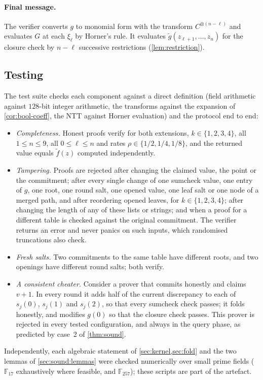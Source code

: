 \paragraph{Final message.}
The verifier converts $g$ to monomial form with the transform $C^{\otimes (n-\ell)}$ and evaluates $G$ at each $\xi_\ell$ by Horner's rule.
It evaluates $\tilde g(z_{\ell+1},\dots,z_{n})$ for the closure check by $n-\ell$ successive restrictions (\cref{lem:restriction}).

\subsection{Testing}\label{sec:impl:tests}

The test suite checks each component against a direct definition (field arithmetic against $128$-bit integer arithmetic, the transforms against the expansion of \cref{cor:bool-coeff}, the NTT against Horner evaluation) and the protocol end to end:
\begin{itemize}
  \item \emph{Completeness.} Honest proofs verify for both extensions, $k \in \{1,2,3,4\}$, all $1 \le n \le 9$, all $0 \le \ell \le n$ and rates $\rho \in \{1/2, 1/4, 1/8\}$, and the returned value equals $\tilde f(z)$ computed independently.
  \item \emph{Tampering.} Proofs are rejected after changing the claimed value, the point or the commitment; after every single change of one sumcheck value, one entry of $g$, one root, one round salt, one opened value, one leaf salt or one node of a merged path, and after reordering opened leaves, for $k \in \{1,2,3,4\}$; after changing the length of any of these lists or strings; and when a proof for a different table is checked against the original commitment. The verifier returns an error and never panics on such inputs, which randomised truncations also check.
  \item \emph{Fresh salts.} Two commitments to the same table have different roots, and two openings have different round salts; both verify.
  \item \emph{A consistent cheater.} Consider a prover that commits honestly and claims $v+1$. In every round it adds half of the current discrepancy to each of $s_j(0)$, $s_j(1)$ and $s_j(2)$, so that every sumcheck check passes; it folds honestly, and modifies $g(0)$ so that the closure check passes. This prover is rejected in every tested configuration, and always in the query phase, as predicted by case~2 of \cref{thm:sound}.
\end{itemize}
Independently, each algebraic statement of \cref{sec:kernel,sec:fold} and the two lemmas of \cref{sec:sound:lemmas} were checked numerically over small prime fields ($\mathbb{F}_{17}$ exhaustively where feasible, and $\mathbb{F}_{257}$); these scripts are part of the artefact.
